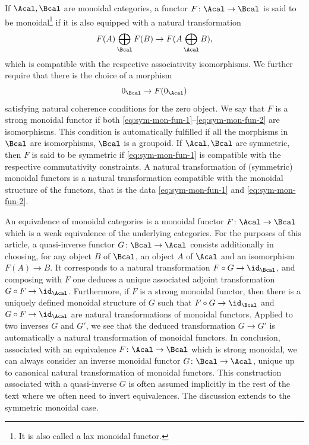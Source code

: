 If $\Acal, \Bcal$ are monoidal categories, a functor $F\colon\Acal\to\Bcal$ is said to be monoidal\footnote{It is also called a lax monoidal functor.} if it is also equipped with a natural transformation
\begin{equation}\label{eq:sym-mon-fun-1}
F(A) \bigoplus_{\Bcal} F(B) \to F(A \bigoplus_\Acal B),
\end{equation}
which is compatible with the respective associativity isomorphisms. We further require that there is the choice of a morphism
\begin{equation}\label{eq:sym-mon-fun-2}
0_\Bcal \to F(0_\Acal)
\end{equation}
satisfying natural coherence conditions for the zero object. We say that $F$ is a strong monoidal functor if both \eqref{eq:sym-mon-fun-1}--\eqref{eq:sym-mon-fun-2} are isomorphisms. This condition is automatically fulfilled if all the morphisms in $\Bcal$ are isomorphisms, \ie $\Bcal$ is a groupoid. If $\Acal, \Bcal$ are symmetric, then $F$ is said to be symmetric if \eqref{eq:sym-mon-fun-1} is compatible with the respective commutativity constraints. A natural transformation of (symmetric) monoidal functors is a natural transformation compatible with the monoidal structure of the functors, that is the data \eqref{eq:sym-mon-fun-1} and \eqref{eq:sym-mon-fun-2}.

An equivalence of monoidal categories is a monoidal functor $F\colon \Acal\to \Bcal$ which is a weak equivalence of the underlying categories. For the purposes of this article, a quasi-inverse functor $G \colon \Bcal \to \Acal$ consists additionally in choosing, for any object $B$ of $\Bcal$, an object $A$ of $\Acal$ and an isomorphism $F(A)\to B$. It corresponds to a natural transformation $F \circ G \to \id_{\Bcal}$, and composing with $F$ one deduces a unique associated adjoint transformation $G \circ F \to \id_{\Acal}$. Furthermore, if $F$ is a strong monoidal functor, then there is a uniquely defined monoidal structure of $G$ such that $F \circ G \to \id_{\Bcal}$ and $G \circ F \to \id_{\Acal}$ are natural transformations of monoidal functors. Applied to two inverses $G$ and $G'$, we see that the deduced transformation $G \to G'$ is automatically a natural transformation of monoidal functors. In conclusion, associated with an equivalence $F \colon \Acal \to \Bcal$ which is strong monoidal, we can always consider an inverse monoidal functor $G \colon \Bcal \to \Acal$, unique up to canonical natural transformation of monoidal functors. This construction associated with a quasi-inverse $G$ is often assumed implicitly in the rest of the text where we often need to invert equivalences. The discussion extends to the symmetric monoidal case.

